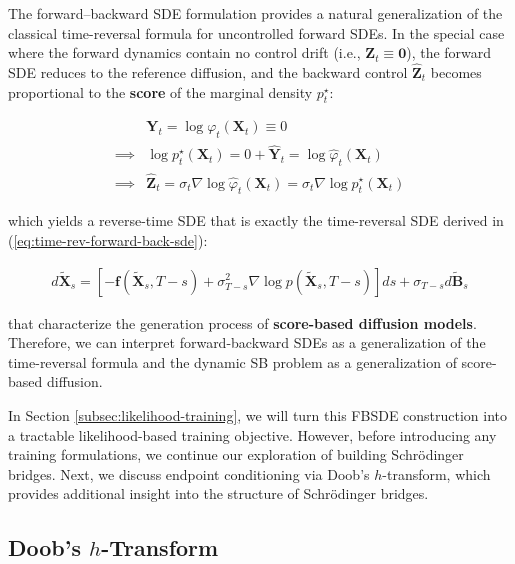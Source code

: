 \documentclass{article}
\begin{document}
\begin{remark}\label{remark:fbsde-generalize}
    The forward–backward SDE formulation provides a natural generalization of the classical time-reversal formula for uncontrolled forward SDEs. In the special case where the forward dynamics contain no control drift (i.e., $\boldsymbol{Z}_t\equiv \boldsymbol{0}$), the forward SDE reduces to the reference diffusion, and the backward control $\widehat{\boldsymbol{Z}}_t$ becomes proportional to the \textbf{score} of the marginal density $p^\star_t$:
    \begin{small}
    \begin{align}
        &\boldsymbol{Y}_t=\log \varphi_t(\boldsymbol{X}_t) \equiv 0\nonumber\\
        \implies &\log p^\star_t (\boldsymbol{X}_t)=0+\widehat{\boldsymbol{Y}}_t=\log \hat\varphi_t(\boldsymbol{X}_t)\nonumber\\
        \implies &\widehat{\boldsymbol{Z}}_t=\sigma_t\nabla \log \hat\varphi_t(\boldsymbol{X}_t)=\sigma_t\nabla \log p_t^\star(\boldsymbol{X}_t)
    \end{align}
    \end{small}
    which yields a reverse-time SDE that is exactly the time-reversal SDE derived in (\ref{eq:time-rev-forward-back-sde}):
    \begin{small}
    \begin{align}
        d\tilde{\boldsymbol{X}}_s=\left[-\boldsymbol{f}(\tilde{\boldsymbol{X}}_s,T-s)+\sigma_{T-s}^2\nabla\log p(\tilde{\boldsymbol{X}}_s,T-s)\right]ds+\sigma_{T-s}d\widetilde{\boldsymbol{B}}_s
    \end{align}
    \end{small}
    that characterize the generation process of \textbf{score-based diffusion models}. Therefore, we can interpret forward-backward SDEs as a generalization of the time-reversal formula and the dynamic SB problem as a generalization of score-based diffusion.
\end{remark}

In Section \ref{subsec:likelihood-training}, we will turn this FBSDE construction into a tractable likelihood-based training objective. However, before introducing any training formulations, we continue our exploration of building Schrödinger bridges. Next, we discuss endpoint conditioning via Doob's $h$-transform, which provides additional insight into the structure of Schrödinger bridges.

\subsection{Doob's $h$-Transform}
\label{subsec:doob-transform}
\end{document}
